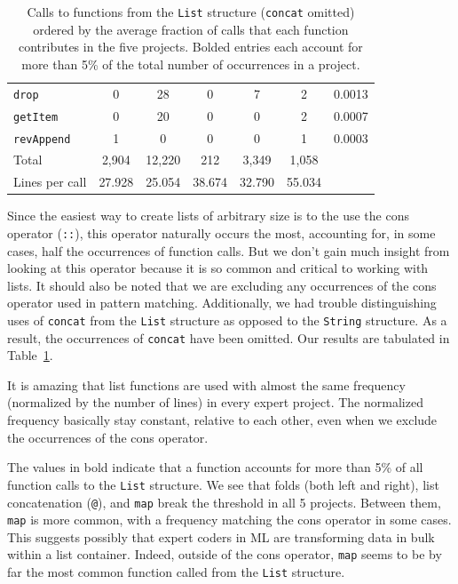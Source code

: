 \documentclass[12pt,abstracton]{scrartcl}
\begin{document}
\begin{table}[h!]
\begin{tabular}{|l||c|c|c|c|c||c|}
\texttt{drop} & 0 & 28 & 0 & 7 & 2 & 0.0013 \\
\texttt{getItem} & 0 & 20 & 0 & 0 & 2 & 0.0007 \\
\texttt{revAppend} & 1 & 0 & 0 & 0 & 1 & 0.0003 \\
\hline\hline
Total & 2,904 & 12,220 & 212 & 3,349 & 1,058 & \\
Lines per call & 27.928 & 25.054 & 38.674 & 32.790 & 55.034 & \\\hline
\end{tabular}
\caption{Calls to functions from the \texttt{List} structure (\texttt{concat} omitted) ordered by the average
fraction of calls that each function contributes in the five projects.
Bolded entries each account for more than 5\% of the total number of occurrences in a project.}
\label{table:list}
\end{table}

Since the easiest way to create lists of arbitrary size is to the use the cons operator (\texttt{::}),
this operator naturally occurs the most, accounting for, in some cases, half
the occurrences of function calls. But we don't gain much insight from looking at this operator
because it is so common and critical to working with lists. It should also be noted
that we are excluding any occurrences of the cons operator used in pattern matching.
Additionally, we had trouble distinguishing uses of \texttt{concat} from the \texttt{List} structure
as opposed to the \texttt{String} structure. As a result, the occurrences of \texttt{concat} have been omitted.
Our results are tabulated in Table~\ref{table:list}.

It is amazing that list functions are used with almost the same frequency (normalized
by the number of lines) in every expert project. The normalized frequency
basically stay constant, relative to each other, even when we exclude the occurrences of the cons operator.

The values in bold indicate that a function accounts for more than 5\% of all function calls to the \texttt{List} structure.
We see that folds (both left and right), list concatenation (\texttt{@}), and \texttt{map} break the threshold in all 5 projects. Between them,
\texttt{map} is more common, with a frequency matching the cons operator in some cases.
This suggests possibly that expert coders in ML are transforming data in bulk within a list container.
Indeed, outside of the cons operator, \texttt{map} seems to be by far the most common function called
from the \texttt{List} structure.
\end{document}
